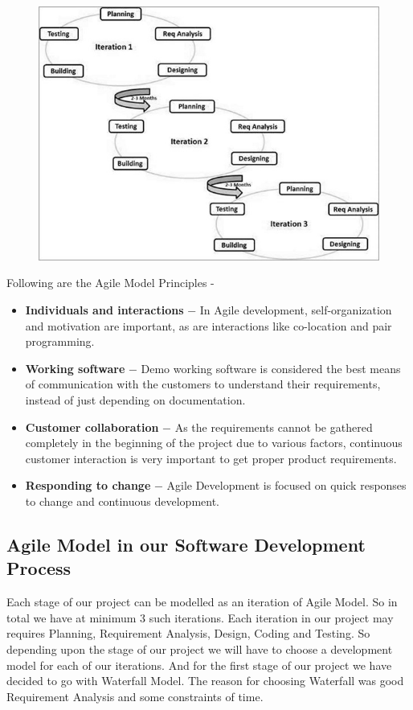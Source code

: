 \documentclass{article}
\begin{document}
\begin{figure}
  \includegraphics[width=\linewidth]{sdlc_agile_model}
\end{figure}

Following are the Agile Model Principles -

\begin{itemize}
\item   \textbf{Individuals and interactions} − In Agile development, self-organization and motivation are important, as are interactions like co-location and pair programming.

\item    \textbf{Working software} − Demo working software is considered the best means of communication with the customers to understand their requirements, instead of just depending on documentation.

\item    \textbf{Customer collaboration} − As the requirements cannot be gathered completely in the beginning of the project due to various factors, continuous customer interaction is very important to get proper product requirements.

\item    \textbf{Responding to change} − Agile Development is focused on quick responses to change and continuous development.
\end{itemize}

\subsection{Agile Model in our Software Development Process}
Each stage of our project can be modelled as an iteration of Agile Model. So in total we have at minimum 3 such iterations. Each iteration in our project may requires Planning, Requirement Analysis, Design, Coding and Testing. So depending upon the stage of our project we will have to choose a development model for each of our iterations. 
And for the first stage of our project we have decided to go with Waterfall Model. The reason for choosing Waterfall was good Requirement Analysis and some constraints of time.
\end{document}
